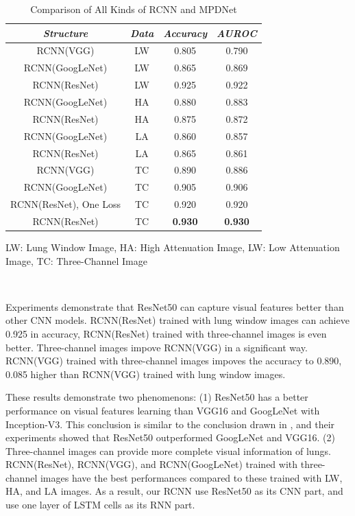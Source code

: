 \documentclass[journal]{IEEEtran}
\begin{document}
\begin{table}[htbp]    
    \caption{Comparison of All Kinds of RCNN and MPDNet}

    \begin{center}
    \begin{tabular}{c|c|c|c}

    \hline
    \textbf{\textit{Structure}} & \textbf{\textit{Data}}& \textbf{\textit{Accuracy}} & \textbf{\textit{AUROC}}\\
    \hline
    RCNN(VGG) & LW & 0.805 &0.790 \\
    RCNN(GoogLeNet) & LW& 0.865 & 0.869 \\
    RCNN(ResNet) & LW & 0.925 & 0.922 \\
    RCNN(GoogLeNet) & HA & 0.880 & 0.883 \\
    RCNN(ResNet)& HA & 0.875 & 0.872 \\
    RCNN(GoogLeNet) & LA & 0.860& 0.857 \\
    RCNN(ResNet) & LA & 0.865 & 0.861 \\
    RCNN(VGG) & TC& 0.890 &0.886 \\
    RCNN(GoogLeNet)& TC & 0.905 & 0.906 \\
    RCNN(ResNet), One Loss & TC& 0.920 & 0.920 \\    
    RCNN(ResNet) & TC& {\bfseries 0.930} &  {\bfseries 0.930} \\
    \hline

    \end{tabular}
    \vspace{-0cm}

    \end{center}
    \footnotesize{LW: Lung Window Image, HA: High Attenuation Image, LW: Low Attenuation Image, TC: Three-Channel Image}

    \vspace{-0cm}\    
    \label{rcnncompare}
    \end{table}


Experiments demonstrate that ResNet50 can capture visual features better than other CNN models. RCNN(ResNet) trained with lung window images can achieve 0.925 in accuracy, RCNN(ResNet) trained with three-channel images is even better. Three-channel images impove RCNN(VGG) in a significant way. RCNN(VGG) trained with three-channel images impoves the accuracy to 0.890, 0.085 higher than RCNN(VGG) trained with lung window images. 

These results demonstrate two phenomenons: (1) ResNet50 has a better performance on visual features learning than VGG16 and GoogLeNet with Inception-V3. This conclusion is similar to the conclusion drawn in \cite{Wang2017ChestX}, and their experiments showed that ResNet50 outperformed GoogLeNet and VGG16. (2) Three-channel images can provide more complete visual information of lungs. RCNN(ResNet), RCNN(VGG), and RCNN(GoogLeNet) trained with three-channel images have the best performances compared to these trained with LW, HA, and LA images. 
As a result, our RCNN use ResNet50 as its CNN part, and use one layer of LSTM cells as its RNN part. 
\end{document}

